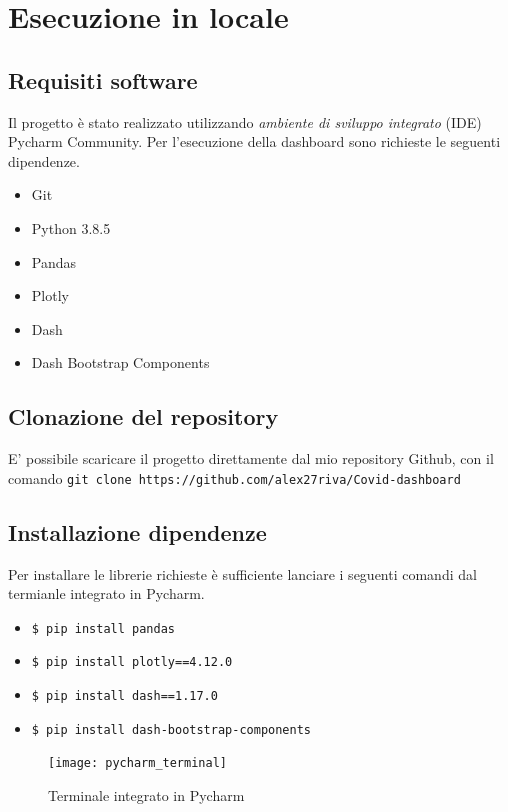 
\section{Esecuzione in locale}

\subsection{Requisiti software}
Il progetto è stato realizzato utilizzando \emph{ambiente di sviluppo integrato} (IDE) Pycharm Community.
Per l'esecuzione della dashboard sono richieste le seguenti dipendenze.
\begin{itemize}
 \item Git
 \item Python 3.8.5
 \item Pandas
 \item Plotly 
 \item Dash 
 \item Dash Bootstrap Components
 \end{itemize}
 
 \subsection{Clonazione del repository}
 E' possibile scaricare il progetto direttamente dal mio repository Github, con il comando \texttt{git clone https://github.com/alex27riva/Covid-dashboard}
 
 \subsection{Installazione dipendenze}
 Per installare le librerie richieste è sufficiente lanciare i seguenti comandi dal termianle integrato in Pycharm.
 
 \begin{itemize}
     \item \texttt{\$ pip install pandas}
     \item \texttt{\$ pip install plotly==4.12.0}
     \item \texttt{\$ pip install dash==1.17.0}
     \item \texttt{\$ pip install dash-bootstrap-components}
 \end{itemize}
 
 \begin{figure}[htp]
    \centering
    \texttt{[image: pycharm\_terminal]}
    \caption{Terminale integrato in Pycharm}
    \label{fig:pycharm_termianl}
\end{figure}

